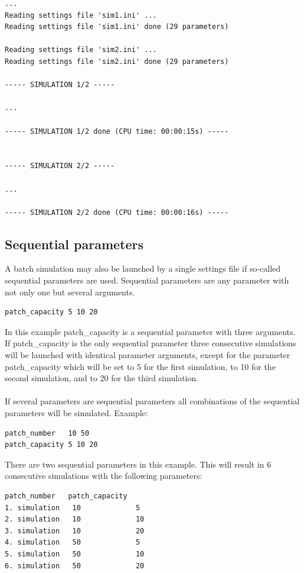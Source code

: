 \documentclass[letterpaper,12pt,oneside]{book}
\begin{document}
\begin{lstlisting}[frame=single]
...
Reading settings file 'sim1.ini' ...
Reading settings file 'sim1.ini' done (29 parameters)

Reading settings file 'sim2.ini' ...
Reading settings file 'sim2.ini' done (29 parameters)

----- SIMULATION 1/2 -----

...

----- SIMULATION 1/2 done (CPU time: 00:00:15s) -----


----- SIMULATION 2/2 -----

...

----- SIMULATION 2/2 done (CPU time: 00:00:16s) -----
\end{lstlisting}

\subsection{Sequential parameters} \label{seqparam}
A batch simulation may also be launched by a single settings file if so-called sequential parameters are used. Sequential parameters are any parameter with not only one but several arguments. 

\begin{lstlisting}[frame=single]
patch_capacity 5 10 20
\end{lstlisting}

In this example \textsf{patch\_capacity} is a sequential parameter with three arguments. If \textsf{patch\_capacity} is the only sequential parameter three consecutive simulations will be launched with identical parameter arguments, except for the parameter \textsf{patch\_capacity} which will be set to 5 for the first simulation, to 10 for the second simulation, and to 20 for the third simulation.\\
\\

If several parameters are sequential parameters all combinations of the sequential parameters will be simulated. Example:
\begin{lstlisting}[frame=single]
patch_number   10 50
patch_capacity 5 10 20
\end{lstlisting}
There are two sequential parameters in this example. This will result in 6 consecutive simulations with the following parameters:
\begin{lstlisting}[frame=single]
                patch_number   patch_capacity
1. simulation   10             5
2. simulation   10             10
3. simulation   10             20
4. simulation   50             5
5. simulation   50             10
6. simulation   50             20
\end{lstlisting}
\end{document}
